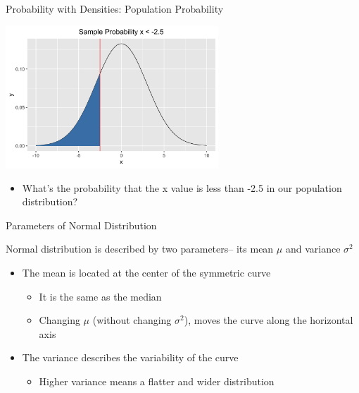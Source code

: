 \documentclass{beamer}
\begin{document}
\begin{frame}{Probability with Densities: Population Probability}
    
	\begin{center}
        \includegraphics[width=0.6\textwidth]{pop_prob.png}
    \end{center}

    \begin{itemize}
        \item What's the probability that the x value is less than -2.5 in our population distribution?
    \end{itemize}
\end{frame}



\begin{frame}{Parameters of Normal Distribution}
	
	Normal distribution is described by two parameters-- its mean $\mu$ and variance $\sigma^2$
	\begin{itemize}
		\item The mean is located at the center of the symmetric curve
		      \begin{itemize}
		      	\item It is the same as the median 
		      	\item Changing $\mu$ (without changing $\sigma^2$), moves the curve along the horizontal axis
		      \end{itemize}
		\item The variance describes the variability of the curve
		      \begin{itemize}
		      	\item Higher variance means a flatter and wider distribution
		      \end{itemize}
	\end{itemize}
	
\end{frame}
\end{document}
